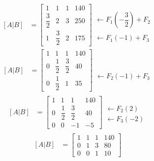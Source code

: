 \documentclass[10pt, a4paper]{article}
\begin{document}
  \begin{align*}
    \left[A|B\right]&=\left[
      \begin{array}{ccc|c}
        1 & 1 & 1 & 140\\[2ex]
        \dfrac{3}{2} & 2 & 3 & 250\\[2ex]
        1 & \dfrac{3}{2} & 2 & 175
      \end{array}
    \right]
    \begin{array}{r}
      \\
      \leftarrow F_1\left(-\dfrac{3}{2}\right)+F_2\\\\
      \leftarrow F_1\left(-1\right)+F_3
    \end{array}
  \end{align*}
  \begin{align*}
    \left[A|B\right]&=\left[
      \begin{array}{ccc|c}
        1 & 1 & 1 & 140\\[2ex]
        0 & \dfrac{1}{2} & \dfrac{3}{2} & 40\\[2ex]
        0 & \dfrac{1}{2} & 1 & 35
      \end{array}
    \right]
    \begin{array}{r}
      \\
      \\
      \\\\
      \leftarrow F_2\left(-1\right)+F_3
    \end{array}
  \end{align*}
  \begin{align*}
    \left[A|B\right]&=\left[
      \begin{array}{ccc|c}
        1 & 1 & 1 & 140\\[2ex]
        0 & \dfrac{1}{2} & \dfrac{3}{2} & 40\\[2ex]
        0 & 0 & -1 & -5
      \end{array}
    \right]
    \begin{array}{r}
      \\\\\\
      \leftarrow F_2\left(2\right)\\
      \leftarrow F_3\left(-2\right)\\\\
    \end{array}
  \end{align*}
  \begin{align*}
    \left[A|B\right]&=\left[
      \begin{array}{ccc|c}
        1 & 1 & 1 & 140\\[2ex]
        0 & 1 & 3 & 80\\[2ex]
        0 & 0 & 1 & 10
      \end{array}
    \right]
  \end{align*}
\end{document}
